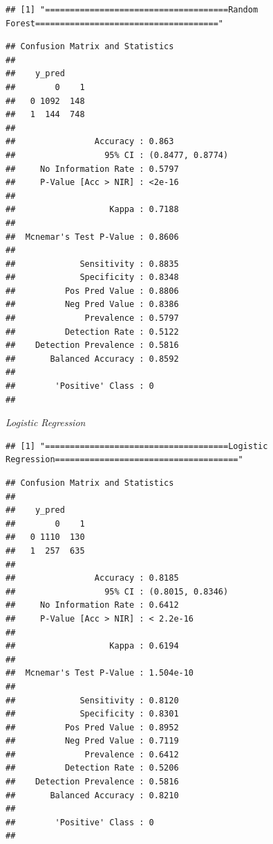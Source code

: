 \documentclass[
]{article}
\begin{document}
\begin{verbatim}
## [1] "=====================================Random Forest====================================="
\end{verbatim}

\begin{verbatim}
## Confusion Matrix and Statistics
## 
##    y_pred
##        0    1
##   0 1092  148
##   1  144  748
##                                           
##                Accuracy : 0.863           
##                  95% CI : (0.8477, 0.8774)
##     No Information Rate : 0.5797          
##     P-Value [Acc > NIR] : <2e-16          
##                                           
##                   Kappa : 0.7188          
##                                           
##  Mcnemar's Test P-Value : 0.8606          
##                                           
##             Sensitivity : 0.8835          
##             Specificity : 0.8348          
##          Pos Pred Value : 0.8806          
##          Neg Pred Value : 0.8386          
##              Prevalence : 0.5797          
##          Detection Rate : 0.5122          
##    Detection Prevalence : 0.5816          
##       Balanced Accuracy : 0.8592          
##                                           
##        'Positive' Class : 0               
## 
\end{verbatim}

\emph{Logistic Regression}

\begin{verbatim}
## [1] "=====================================Logistic Regression====================================="
\end{verbatim}

\begin{verbatim}
## Confusion Matrix and Statistics
## 
##    y_pred
##        0    1
##   0 1110  130
##   1  257  635
##                                           
##                Accuracy : 0.8185          
##                  95% CI : (0.8015, 0.8346)
##     No Information Rate : 0.6412          
##     P-Value [Acc > NIR] : < 2.2e-16       
##                                           
##                   Kappa : 0.6194          
##                                           
##  Mcnemar's Test P-Value : 1.504e-10       
##                                           
##             Sensitivity : 0.8120          
##             Specificity : 0.8301          
##          Pos Pred Value : 0.8952          
##          Neg Pred Value : 0.7119          
##              Prevalence : 0.6412          
##          Detection Rate : 0.5206          
##    Detection Prevalence : 0.5816          
##       Balanced Accuracy : 0.8210          
##                                           
##        'Positive' Class : 0               
## 
\end{verbatim}
\end{document}
